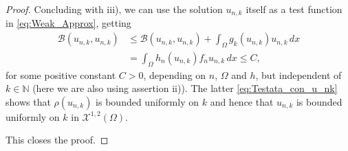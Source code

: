 \documentclass[11pt,a4paper]{amsart}
\theoremstyle{definition}
\theoremstyle{plain}
\numberwithin{equation}{section}
\begin{document}
{\begin{proof}
Concluding with iii), we can use the solution $u_{n,k}$ itself as a test function in \eqref{eq:Weak_Approx}, getting
\begin{equation}\label{eq:Testata_con_u_nk}
\begin{aligned}
\mathcal{B}(u_{n,k},u_{n,k}) & \leq \mathcal{B}(u_{n,k},u_{n,k}) + \int_{\Omega}g_{k}(u_{n,k})u_{n,k}\,dx \\
&=\int_{\Omega}h_{n}(u_{n,k})f_{n}u_{n,k}\,dx \leq C,
\end{aligned} 
\end{equation}  
  \noindent for some positive constant $C>0$, depending on $n$, $\Omega$ and $h$, but independent of $k\in \mathbb{N}$ (here we are also using assertion ii)).
  The latter \eqref{eq:Testata_con_u_nk} shows that $\rho(u_{n,k})$ is bounded uniformly on $k$ and hence that $u_{n,k}$ is bounded uniformly on $k$ in $\mathcal{X}^{1,2}(\Omega)$. 

This closes the proof.
  \end{proof}
  
}
\end{document}
